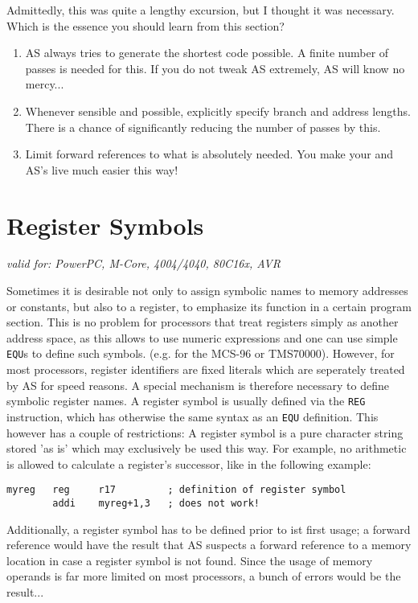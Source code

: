 \documentclass[12pt,twoside]{report}
\makeatletter
\newcommand{\tty}[1]{{\tt #1}}
\newcommand{\ttindex}[1]{\index{#1@{\tt #1}}}
\makeatother
\begin{document}
Admittedly, this was quite a lengthy excursion, but I thought it was
necessary.  Which is the essence you should learn from this section?
\begin{enumerate}
\item{AS always tries to generate the shortest code possible.  A
      finite number of passes is needed for this.  If you do not tweak
      AS extremely, AS will know no mercy...}
\item{Whenever sensible and possible, explicitly specify branch and 
      address lengths.  There is a chance of significantly reducing the
      number of passes by this.}
\item{Limit forward references to what is absolutely needed.  You make
      your and AS's live much easier this way!}
\end{enumerate}


\section{Register Symbols}
\label{SectRegSyms} \ttindex{register symbols}

{\em valid for: PowerPC, M-Core, 4004/4040, 80C16x, AVR}

Sometimes it is desirable not only to assign symbolic names to memory
addresses or constants, but also to a register, to emphasize its function
in a certain program section.  This is no problem for processors that
treat registers simply as another address space, as this allows to use
numeric expressions and one can use simple \tty{EQU}s to define such
symbols.  (e.g. for the MCS-96 or TMS70000).  However, for most
processors, register identifiers are fixed literals which are seperately
treated by AS for speed reasons.  A special mechanism is therefore
necessary to define symbolic register names.  A register symbol is usually
defined via the \tty{REG} instruction, which has otherwise the same syntax
as an \tty{EQU} definition.  This however has a couple of restrictions: A
register symbol is a pure character string stored 'as is' which may
exclusively be used this way.  For example, no arithmetic is allowed to
calculate a register's successor, like in the following example:
\begin{verbatim}
myreg   reg     r17         ; definition of register symbol
        addi    myreg+1,3   ; does not work!
\end{verbatim}
Additionally, a register symbol has to be defined prior to ist first
usage; a forward reference would have the result that AS suspects a
forward reference to a memory location in case a register symbol is not
found.  Since the usage of memory operands is far more limited on most
processors, a bunch of errors would be the result...
\end{document}
